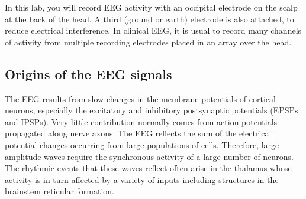 \documentclass[letterpaper,10pt,english]{jupyterBook}
\begin{document}
\sphinxAtStartPar
In this lab, you will record EEG activity with an occipital electrode on the scalp at the back of the head. A third (ground or earth) electrode is also attached, to reduce electrical interference. In clinical EEG, it is usual to record many channels of activity from multiple recording electrodes placed in an array over the head.


\subsection{Origins of the EEG signals}
\label{\detokenize{EEG:origins-of-the-eeg-signals}}
\sphinxAtStartPar
The EEG results from slow changes in the membrane potentials of cortical neurons, especially the excitatory and inhibitory post\sphinxhyphen{}synaptic potentials (EPSPs and IPSPs). Very little contribution normally comes from action potentials propagated along nerve axons. The EEG reflects the sum of the electrical potential changes occurring from large populations of cells. Therefore, large amplitude waves require the synchronous activity of a large number of neurons. The rhythmic events that these waves reflect often arise in the thalamus whose activity is in turn affected by a variety of inputs including structures in the brainstem reticular formation.
\end{document}
